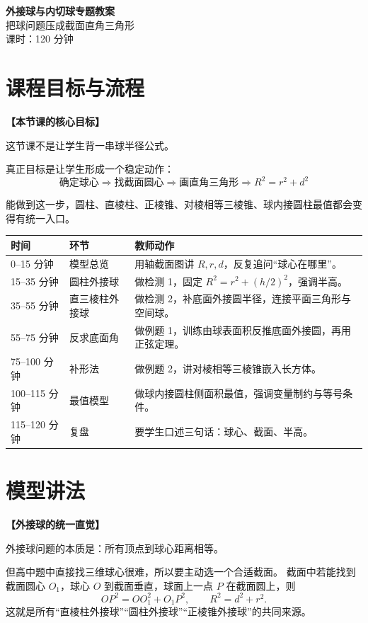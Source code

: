 \documentclass[11pt,a4paper]{ctexart}
\providecommand{\teachblock}[2]{%
  \par\addvspace{0.55em}%
  \noindent\textbf{【#1】}\par\nobreak
  \begingroup
    \raggedright
    \setlength{\parskip}{0.35em}%
    #2\par
  \endgroup
}
\begin{document}
\begin{center}
  {\Large\bfseries 外接球与内切球专题教案}\\
  \vspace{0.35em}
  {\large 把球问题压成截面直角三角形}\\
  \vspace{0.35em}
  课时：120 分钟
\end{center}

\section{课程目标与流程}

\teachblock{本节课的核心目标}{
  这节课不是让学生背一串球半径公式。

  真正目标是让学生形成一个稳定动作：
  \[
    \boxed{
    \text{确定球心}
    \Rightarrow
    \text{找截面圆心}
    \Rightarrow
    \text{画直角三角形}
    \Rightarrow
    R^2=r^2+d^2}
  \]

  能做到这一步，圆柱、直棱柱、正棱锥、对棱相等三棱锥、球内接圆柱最值都会变得有统一入口。
}

\begin{tabularx}{\textwidth}{p{2.5cm}p{2.4cm}X}
\toprule
时间 & 环节 & 教师动作\\
\midrule
0--15 分钟 & 模型总览 & 用轴截面图讲 $R,r,d$，反复追问“球心在哪里”。\\ \hline
15--35 分钟 & 圆柱外接球 & 做检测 1，固定 $R^2=r^2+(h/2)^2$，强调半高。\\ \hline
35--55 分钟 & 直三棱柱外接球 & 做检测 2，补底面外接圆半径，连接平面三角形与空间球。\\ \hline
55--75 分钟 & 反求底面角 & 做例题 1，训练由球表面积反推底面外接圆，再用正弦定理。\\ \hline
75--100 分钟 & 补形法 & 做例题 2，讲对棱相等三棱锥嵌入长方体。\\ \hline
100--115 分钟 & 最值模型 & 做球内接圆柱侧面积最值，强调变量制约与等号条件。\\ \hline
115--120 分钟 & 复盘 & 要学生口述三句话：球心、截面、半高。\\
\bottomrule
\end{tabularx}

\section{模型讲法}

\teachblock{外接球的统一直觉}{
  外接球问题的本质是：所有顶点到球心距离相等。

  但高中题中直接找三维球心很难，所以要主动选一个合适截面。
  截面中若能找到截面圆心 $O_1$，球心 $O$ 到截面垂直，球面上一点 $P$ 在截面圆上，则
  \[
    OP^2=OO_1^2+O_1P^2,
    \qquad
    R^2=d^2+r^2.
  \]
  这就是所有“直棱柱外接球”“圆柱外接球”“正棱锥外接球”的共同来源。
}
\end{document}
